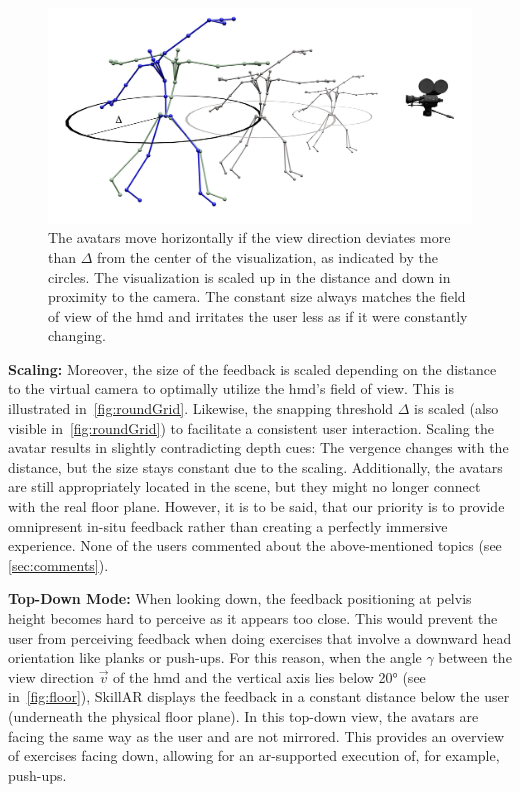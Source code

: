 \begin{figure}[t!]
	\centering
	\includegraphics[width=0.6\linewidth]{pictures/gridRound.png}
	\caption[Spatial stabilization of the feedback positioning.]{The avatars move horizontally if the view direction deviates more than $\Delta$ from the center of the visualization, as indicated by the circles. The visualization is scaled up in the distance and down in proximity to the camera. The constant size always matches the field of view of the \acrshort{hmd} and irritates the user less as if it were constantly changing.\label{fig:roundGrid}}
\end{figure}

\textbf{Scaling:}
Moreover, the size of the feedback is scaled depending on the distance to the virtual camera to optimally utilize the \acrshort{hmd}'s field of view.  This is illustrated in~\autoref{fig:roundGrid}. Likewise, the snapping threshold $\Delta$ is scaled (also visible in~\autoref{fig:roundGrid}) to facilitate a consistent user interaction. Scaling the avatar results in slightly contradicting depth cues: The vergence changes with the distance, but the size stays constant due to the scaling. Additionally, the avatars are still appropriately located in the scene, but they might no longer connect with the real floor plane. However, it is to be said, that our priority is to provide omnipresent in-situ feedback rather than creating a perfectly immersive experience. None of the users commented about the above-mentioned topics (see \autoref{sec:comments}).

\textbf{Top-Down Mode:}
When looking down, the feedback positioning at pelvis height becomes hard to perceive as it appears too close. This would prevent the user from perceiving feedback when doing exercises that involve a downward head orientation like planks or push-ups. For this reason, when the angle $\gamma$ between the view direction $\vec{v}$ of the \acrshort{hmd} and the vertical axis lies below 20° (see in~\autoref{fig:floor}), SkillAR displays the feedback in a constant distance below the user (underneath the physical floor plane). In this top-down view, the avatars are facing the same way as the user and are not mirrored. This provides an overview of exercises facing down, allowing for an \acrshort{ar}-supported execution of, for example, push-ups.

